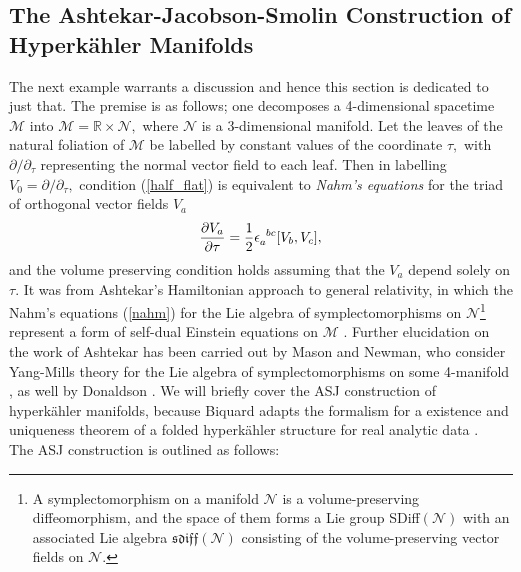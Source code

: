 \documentclass[a4paper,12pt, onecolumn, notitlepage]{article}
\theoremstyle{definition}
\theoremstyle{remark}
\newcommand{\e}{\epsilon}
\newcommand{\dd}[2]{\frac{\partial #1}{\partial #2}}
\newcommand{\HK}{hyperk\"ahler }
\newcommand{\R}{\mathbb{R}}
\begin{document}
\subsection{The Ashtekar-Jacobson-Smolin Construction of Hyperk\"ahler Manifolds}
The next example warrants a discussion and hence this section is dedicated to just that. The premise is as follows; one decomposes a 4-dimensional spacetime $\mathcal{M}$ into $\mathcal{M}=\R\times \mathcal{N},$ where $\mathcal{N}$ is a 3-dimensional manifold. Let the leaves of the natural foliation of $\mathcal{M}$ be labelled by constant values of the coordinate $\tau,$ with $\partial/\partial_{\tau}$ representing the normal vector field to each leaf. Then in labelling $V_{0}=\partial/\partial_{\tau},$ condition (\ref{half_flat}) is equivalent to \emph{Nahm's equations} for the triad of orthogonal vector fields $V_{a}$
\begin{equation}
\label{nahm}
\dd{V_{a}}{\tau} = \frac{1}{2}\e\indices{_a^b^c}[V_{b},V_{c}],
\end{equation}
and the volume preserving condition holds assuming that the $V_{a}$ depend solely on $\tau.$ It was from Ashtekar's Hamiltonian approach to general relativity, in which the Nahm's equations (\ref{nahm}) for the Lie algebra of symplectomorphisms on $\mathcal{N}$\footnote{A symplectomorphism on a manifold $\mathcal{N}$ is a  volume-preserving diffeomorphism, and the space of them forms a Lie group  SDiff$(\mathcal{N})$ with an associated Lie algebra $\mathfrak{sdiff}(\mathcal{N})$ consisting of the volume-preserving vector fields on $\mathcal{N}.$} represent a form of self-dual Einstein equations on $\mathcal{M}$ \cite{ashtekar_1987}. Further elucidation on the work of Ashtekar has been carried out by Mason and Newman, who consider Yang-Mills theory for the Lie algebra of symplectomorphisms on some 4-manifold \cite{mason_1989}, as well by Donaldson \cite{donaldson}. We will briefly cover the ASJ construction of \HK manifolds, because Biquard adapts the formalism for a existence and uniqueness theorem of a folded \HK structure for real analytic data \cite{biquard_2015}.\\
The ASJ construction is outlined as follows:\\
\end{document}

